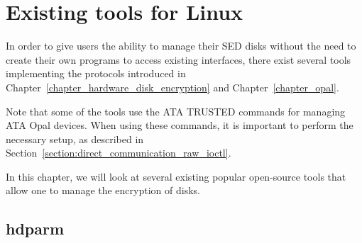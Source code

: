 
\chapter{Existing tools for Linux}
\label{chapter_tools}

In order to give users the ability to manage their SED disks without the need to create their own programs to access existing interfaces, there exist several tools implementing the protocols introduced in Chapter~\ref{chapter_hardware_disk_encryption} and Chapter~\ref{chapter_opal}. 

Note that some of the tools use the ATA TRUSTED commands for managing ATA Opal devices. When using these commands, it is important to perform the necessary setup, as described in Section~\ref{section:direct_communication_raw_ioctl}.

In this chapter, we will look at several existing popular open-source tools that allow one to manage the encryption of disks.





\section{hdparm}
 

